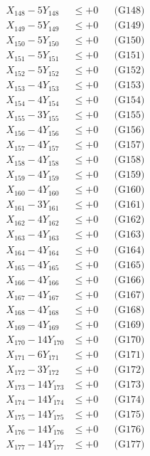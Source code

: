 \documentclass[a4paper,10pt]{article}
\begin{document}
{\begin{align}
X_{148} - 5Y_{148} &\leq +0 && \text{(G148)} \\
X_{149} - 5Y_{149} &\leq +0 && \text{(G149)} \\
X_{150} - 5Y_{150} &\leq +0 && \text{(G150)} \\
X_{151} - 5Y_{151} &\leq +0 && \text{(G151)} \\
X_{152} - 5Y_{152} &\leq +0 && \text{(G152)} \\
X_{153} - 4Y_{153} &\leq +0 && \text{(G153)} \\
X_{154} - 4Y_{154} &\leq +0 && \text{(G154)} \\
X_{155} - 3Y_{155} &\leq +0 && \text{(G155)} \\
\allowbreak
X_{156} - 4Y_{156} &\leq +0 && \text{(G156)} \\
X_{157} - 4Y_{157} &\leq +0 && \text{(G157)} \\
X_{158} - 4Y_{158} &\leq +0 && \text{(G158)} \\
X_{159} - 4Y_{159} &\leq +0 && \text{(G159)} \\
X_{160} - 4Y_{160} &\leq +0 && \text{(G160)} \\
X_{161} - 3Y_{161} &\leq +0 && \text{(G161)} \\
X_{162} - 4Y_{162} &\leq +0 && \text{(G162)} \\
X_{163} - 4Y_{163} &\leq +0 && \text{(G163)} \\
X_{164} - 4Y_{164} &\leq +0 && \text{(G164)} \\
X_{165} - 4Y_{165} &\leq +0 && \text{(G165)} \\
\allowbreak
X_{166} - 4Y_{166} &\leq +0 && \text{(G166)} \\
X_{167} - 4Y_{167} &\leq +0 && \text{(G167)} \\
X_{168} - 4Y_{168} &\leq +0 && \text{(G168)} \\
X_{169} - 4Y_{169} &\leq +0 && \text{(G169)} \\
X_{170} - 14Y_{170} &\leq +0 && \text{(G170)} \\
X_{171} - 6Y_{171} &\leq +0 && \text{(G171)} \\
X_{172} - 3Y_{172} &\leq +0 && \text{(G172)} \\
X_{173} - 14Y_{173} &\leq +0 && \text{(G173)} \\
X_{174} - 14Y_{174} &\leq +0 && \text{(G174)} \\
X_{175} - 14Y_{175} &\leq +0 && \text{(G175)} \\
\allowbreak
X_{176} - 14Y_{176} &\leq +0 && \text{(G176)} \\
X_{177} - 14Y_{177} &\leq +0 && \text{(G177)} \\

\end{align}}
\end{document}

